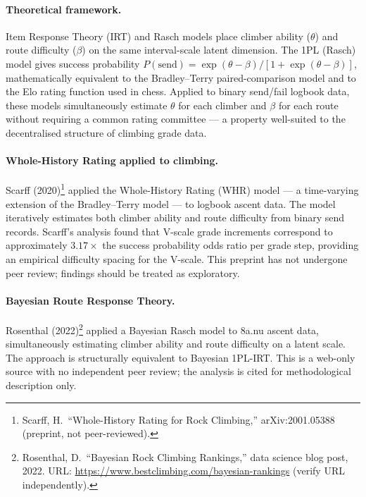 \paragraph{Theoretical framework.}
Item Response Theory (IRT) and Rasch models place climber ability ($\theta$) and route difficulty ($\beta$) on the same interval-scale latent dimension. The 1PL (Rasch) model gives success probability $P(\text{send}) = \exp(\theta - \beta) / [1 + \exp(\theta - \beta)]$, mathematically equivalent to the Bradley--Terry paired-comparison model and to the Elo rating function used in chess. Applied to binary send/fail logbook data, these models simultaneously estimate $\theta$ for each climber and $\beta$ for each route without requiring a common rating committee --- a property well-suited to the decentralised structure of climbing grade data.

\paragraph{Whole-History Rating applied to climbing.}
Scarff (2020)\footnote{Scarff, H.\ ``Whole-History Rating for Rock Climbing,'' arXiv:2001.05388 (preprint, not peer-reviewed).} applied the Whole-History Rating (WHR) model --- a time-varying extension of the Bradley--Terry model --- to logbook ascent data. The model iteratively estimates both climber ability and route difficulty from binary send records. Scarff's analysis found that V-scale grade increments correspond to approximately $3.17\times$ the success probability odds ratio per grade step, providing an empirical difficulty spacing for the V-scale. This preprint has not undergone peer review; findings should be treated as exploratory.

\paragraph{Bayesian Route Response Theory.}
Rosenthal (2022)\singlesource\footnote{Rosenthal, D.\ ``Bayesian Rock Climbing Rankings,'' data science blog post, 2022. URL: \url{https://www.bestclimbing.com/bayesian-rankings} (verify URL independently).} applied a Bayesian Rasch model to 8a.nu ascent data, simultaneously estimating climber ability and route difficulty on a latent scale. The approach is structurally equivalent to Bayesian 1PL-IRT. This is a web-only source with no independent peer review; the analysis is cited for methodological description only.

